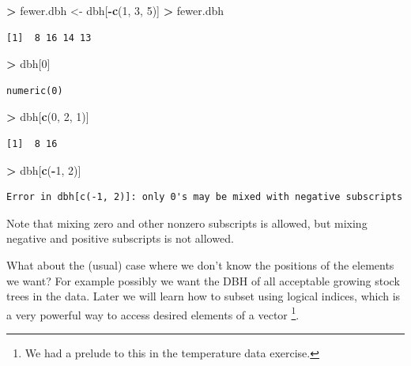 \documentclass[]{krantz}
\makeatletter
\newenvironment{Shaded}{\begin{snugshade}}{\end{snugshade}}
\newcommand{\KeywordTok}[1]{\textcolor[rgb]{0.27,0.27,0.27}{\textbf{#1}}}
\newcommand{\DecValTok}[1]{\textcolor[rgb]{0.06,0.06,0.06}{#1}}
\newcommand{\StringTok}[1]{\textcolor[rgb]{0.5,0.5,0.5}{#1}}
\newcommand{\OperatorTok}[1]{\textcolor[rgb]{0.43,0.43,0.43}{\textbf{#1}}}
\newcommand{\NormalTok}[1]{#1}
\newenvironment{kframe}{%
\medskip{}
\setlength{\fboxsep}{.8em}
 \def\at@end@of@kframe{}%
 \ifinner\ifhmode%
  \def\at@end@of@kframe{\end{minipage}}%
  \begin{minipage}{\columnwidth}%
 \fi\fi%
 \def\FrameCommand##1{\hskip\@totalleftmargin \hskip-\fboxsep
 \colorbox{shadecolor}{##1}\hskip-\fboxsep
     \hskip-\linewidth \hskip-\@totalleftmargin \hskip\columnwidth}%
 \MakeFramed {\advance\hsize-\width
   \@totalleftmargin\z@ \linewidth\hsize
   \@setminipage}}%
 {\par\unskip\endMakeFramed%
 \at@end@of@kframe}
\renewenvironment{Shaded}{\begin{kframe}}{\end{kframe}}
\theoremstyle{definition}
\theoremstyle{definition}
\theoremstyle{definition}
\theoremstyle{remark}
\makeatother
\begin{document}
\begin{Shaded}
\begin{Highlighting}[]
\OperatorTok{>}\StringTok{ }\NormalTok{fewer.dbh <-}\StringTok{ }\NormalTok{dbh[}\OperatorTok{-}\KeywordTok{c}\NormalTok{(}\DecValTok{1}\NormalTok{, }\DecValTok{3}\NormalTok{, }\DecValTok{5}\NormalTok{)]}
\OperatorTok{>}\StringTok{ }\NormalTok{fewer.dbh}
\end{Highlighting}
\end{Shaded}

\begin{verbatim}
[1]  8 16 14 13
\end{verbatim}

\begin{Shaded}
\begin{Highlighting}[]
\OperatorTok{>}\StringTok{ }\NormalTok{dbh[}\DecValTok{0}\NormalTok{]}
\end{Highlighting}
\end{Shaded}

\begin{verbatim}
numeric(0)
\end{verbatim}

\begin{Shaded}
\begin{Highlighting}[]
\OperatorTok{>}\StringTok{ }\NormalTok{dbh[}\KeywordTok{c}\NormalTok{(}\DecValTok{0}\NormalTok{, }\DecValTok{2}\NormalTok{, }\DecValTok{1}\NormalTok{)]}
\end{Highlighting}
\end{Shaded}

\begin{verbatim}
[1]  8 16
\end{verbatim}

\begin{Shaded}
\begin{Highlighting}[]
\OperatorTok{>}\StringTok{ }\NormalTok{dbh[}\KeywordTok{c}\NormalTok{(}\OperatorTok{-}\DecValTok{1}\NormalTok{, }\DecValTok{2}\NormalTok{)]}
\end{Highlighting}
\end{Shaded}

\begin{verbatim}
Error in dbh[c(-1, 2)]: only 0's may be mixed with negative subscripts
\end{verbatim}

Note that mixing zero and other nonzero subscripts is allowed, but
mixing negative and positive subscripts is not allowed.

What about the (usual) case where we don't know the positions of the
elements we want? For example possibly we want the DBH of all acceptable
growing stock trees in the data. Later we will learn how to subset using
logical indices, which is a very powerful way to access desired elements
of a vector \footnote{We had a prelude to this in the temperature data
  exercise.}.
\end{document}
